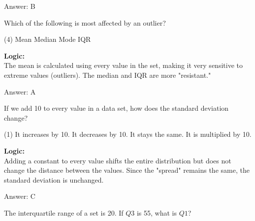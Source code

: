 \documentclass[11pt,paper=a4,answers]{exam}
\begin{document}
\begin{questions}
\begin{solution}
\vspace{30pt}

Answer: \colorbox{yellow!100}{B}
\end{solution}

\vspace{60pt}

\question
Which of the following is most affected by an outlier?
\begin{tasks}(4)
    \task Mean
    \task Median
    \task Mode
    \task IQR
\end{tasks}

\begin{solution}
\textbf{Logic:} \\
The mean is calculated using every value in the set, making it very sensitive to extreme values (outliers). The median and IQR are more "resistant."

\vspace{30pt}

Answer: \colorbox{yellow!100}{A}
\end{solution}

\vspace{60pt}

\question
If we add 10 to every value in a data set, how does the standard deviation change?
\begin{tasks}(1)
    \task It increases by 10.
    \task It decreases by 10.
    \task It stays the same.
    \task It is multiplied by 10.
\end{tasks}

\begin{solution}
\textbf{Logic:} \\
Adding a constant to every value shifts the entire distribution but does not change the distance between the values. Since the "spread" remains the same, the standard deviation is unchanged.

\vspace{30pt}

Answer: \colorbox{yellow!100}{C}
\end{solution}

\vspace{60pt}

\question
The interquartile range of a set is 20. If $Q3$ is 55, what is $Q1$?


\end{questions}
\end{document}

